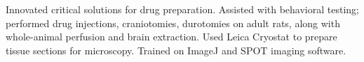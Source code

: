 \documentclass[10pt, oneside]{article}
\begin{document}
	Innovated critical solutions for drug preparation.
  		 Assisted with behavioral testing; performed drug injections, craniotomies, durotomies on adult rats, along with %
		 whole-animal perfusion and brain extraction.
		 Used Leica Cryostat to prepare tissue sections for microscopy.  %
		 Trained on ImageJ and SPOT imaging software.
	


%
%
%

%
%
%
%
\begin{comment}
\vspace{5mm}
{\large \textbf{Presentations}}%

\textbf{Wickstrom, A.T.} Spectral domain optical coherence tomography for the assessment of cerebrovascular plasticity.  Poster presented at: Society for Neuroscience, annual meeting. November 15, 2016. San Diego, CA.

 \textbf{Wickstrom, A.T.} Cerebrovascular Plasticity Assessed by Spectral-Domain Optical \newline Coherence Tomography.
	\color{blue}\href {https://sites.google.com/site/atwreferencesapril2015/}{Poster} \color{black}presented at:\hspace{2pt}\color{blue}\href{http://dc.uwm.edu/uwsurca/2015/Poster1/55/}{\textit{14th Annual UW System Symposium}}\newline
	\color{black}\textit{for Undergraduate Research \& Creative Activity}; April 24, 2015. Milwaukee, WI.
\color{blue}

\color{black}
 \textbf{Wickstrom, A.T.} Optogenetic Manipulation of Thalamic Reticular Subnetworks. \newline Oral presentation delivered at:\hspace{2pt}\color{blue}\href{https://sites.google.com/site/uwmnci/}			{\textit{UWM Neuronal Control \& Interference Journal Club}}\color{black}; December 11, 2014. Milwaukee, WI.

 \textbf{Wickstrom, A.T.}, Behnke, V.K., \& Garnett, E.D. Exercise, Learning, and the Expression of HIF-1$\alpha$ in the
	Hippocampus of the Adult Rat. 
	Poster presented at:\hspace{3pt}\textit{13th Annual UW System Symposium for Undergraduate Research \& Creative Activity}; 
	April 11, 2014. Milwaukee, WI.
\end{comment}
\end{document}
